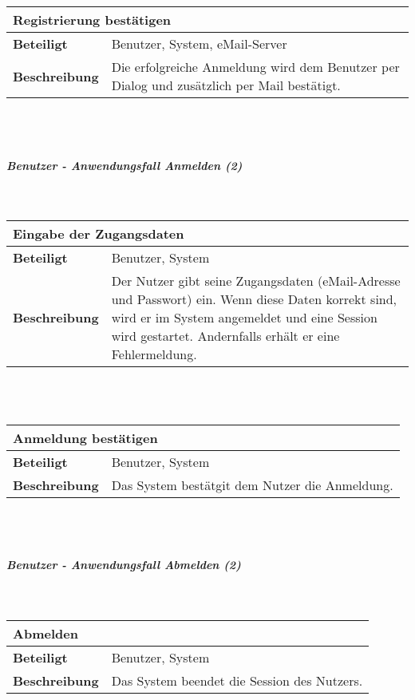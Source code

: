 \documentclass[12pt,a4paper]{article}
\begin{document}
\begin{tabular}{l p{10cm}}
\multicolumn{2}{l}{\textbf{Registrierung bestätigen}} \\ \hline
\textbf{Beteiligt} & Benutzer, System, eMail-Server \\ \hline 
\textbf{Beschreibung} & Die erfolgreiche Anmeldung wird dem Benutzer per Dialog und zusätzlich per Mail bestätigt.\\ 
\hline 
\end{tabular}\\\\
\subparagraph{Benutzer - Anwendungsfall \glqq Anmelden \grqq (2)}\mbox{}\\

\begin{tabular}{l p{10cm}}
\multicolumn{2}{l}{\textbf{Eingabe der Zugangsdaten}} \\ \hline
\textbf{Beteiligt} & Benutzer, System \\ \hline 
\textbf{Beschreibung} & Der Nutzer gibt seine Zugangsdaten (eMail-Adresse und Passwort) ein. Wenn diese Daten korrekt sind, wird er im System angemeldet und eine Session wird gestartet. Andernfalls erhält er eine Fehlermeldung.\\ 
\hline 
\end{tabular}\\\\

\begin{tabular}{l p{10cm}}
\multicolumn{2}{l}{\textbf{Anmeldung bestätigen}} \\ \hline
\textbf{Beteiligt} & Benutzer, System \\ \hline 
\textbf{Beschreibung} & Das System bestätgit dem Nutzer die Anmeldung.\\ 
\hline 
\end{tabular}\\\\
\subparagraph{Benutzer - Anwendungsfall \glqq Abmelden \grqq (2)}\mbox{}\\

\begin{tabular}{l p{10cm}}
\multicolumn{2}{l}{\textbf{Abmelden}} \\ \hline
\textbf{Beteiligt} & Benutzer, System \\ \hline 
\textbf{Beschreibung} & Das System beendet die Session des Nutzers.\\ 
\hline 
\end{tabular}\\\\
\end{document}

